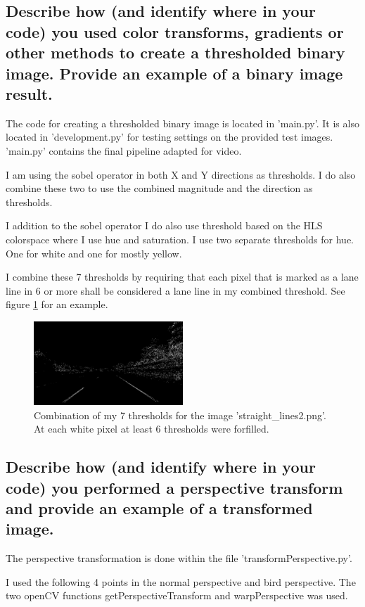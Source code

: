 \documentclass[12pt,a4paper]{article}
\begin{document}
\subsection{Describe how (and identify where in your code) you used color transforms, gradients or other methods to create a thresholded binary image.  Provide an example of a binary image result.}
The code for creating a thresholded binary image is located in 'main.py'. It is also located in 'development.py' for testing settings on the provided test images. 'main.py' contains the final pipeline adapted for video.

I am using the sobel operator in both X and Y directions as thresholds. I do also combine these two to use the combined magnitude and the direction as thresholds.

I addition to the sobel operator I do also use threshold based on the HLS colorspace where I use hue and saturation. I use two separate thresholds for hue. One for white and one for mostly yellow.

I combine these 7 thresholds by requiring that each pixel that is marked as a lane line in 6 or more shall be considered a lane line in my combined threshold. See figure \ref{threshold} for an example.

\begin{figure}
  \centering
    \includegraphics[width=0.5\textwidth]{../output_images/combined-straight_lines2.png}
    \caption{Combination of my 7 thresholds for the image 'straight\_lines2.png'. At each white pixel at least 6 thresholds were forfilled.}
    \label{threshold}
\end{figure}

\subsection{Describe how (and identify where in your code) you performed a perspective transform and provide an example of a transformed image.}
The perspective transformation is done within the file 'transformPerspective.py'.

I used the following 4 points in the normal perspective and bird perspective. The two openCV functions getPerspectiveTransform and warpPerspective was used.
\end{document}
